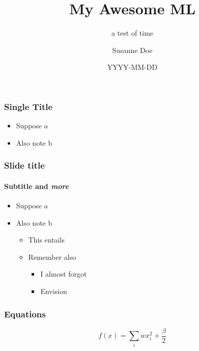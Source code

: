 \documentclass[aspectratio=1610]{beamer}
\title{My Awesome ML}
\subtitle{a test of time}
\author{Susanne Doe}
\date{YYYY-MM-DD}
\institute{Insitute of Things}
\begin{document}
\maketitle

\begin{frame}
    \frametitle{Single Title}
    
    \begin{itemize}
        \item Suppose $a$
        \item Also note b
    \end{itemize}
\end{frame}

\begin{frame}
    \frametitle{Slide title}
    \framesubtitle{\textbf{Subtitle} and \emph{more}}
    
    \begin{itemize}
        \item Suppose $a$
        \item Also note b
        \begin{itemize}
            \item This entails
            \item Remember also
            \begin{itemize}
                \item I almost forgot
                \item Envision
            \end{itemize}
        \end{itemize}
    \end{itemize}
\end{frame}


\begin{frame}
\frametitle{Equations}

    \begin{equation*}
        f(x) = \sum_i wx_i^2 + \frac{\beta}{2}
    \end{equation*}
\end{frame}
\end{document}
